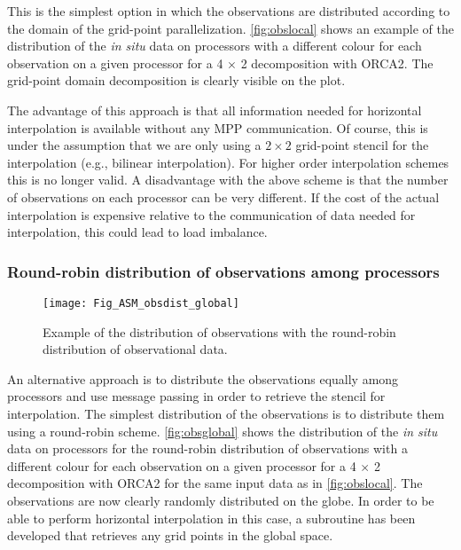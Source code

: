 \documentclass[../main/NEMO_manual]{subfiles}
\begin{document}
This is the simplest option in which the observations are distributed according to
the domain of the grid-point parallelization.
\autoref{fig:obslocal} shows an example of the distribution of the {\em in situ} data on processors with
a different colour for each observation on a given processor for a 4 $\times$ 2 decomposition with ORCA2. 
The grid-point domain decomposition is clearly visible on the plot.

The advantage of this approach is that all information needed for horizontal interpolation is available without
any MPP communication.
Of course, this is under the assumption that we are only using a $2 \times 2$ grid-point stencil for
the interpolation (e.g., bilinear interpolation).
For higher order interpolation schemes this is no longer valid.
A disadvantage with the above scheme is that the number of observations on each processor can be very different.
If the cost of the actual interpolation is expensive relative to the communication of data needed for interpolation,
this could lead to load imbalance.

\subsubsection{Round-robin distribution of observations among processors}

\begin{figure}
  \begin{center}
    \texttt{[image: Fig\_ASM\_obsdist\_global]}
    \caption{
      \protect\label{fig:obsglobal}
      Example of the distribution of observations with the round-robin distribution of observational data.
    }
  \end{center}
\end{figure}

An alternative approach is to distribute the observations equally among processors and
use message passing in order to retrieve the stencil for interpolation.
The simplest distribution of the observations is to distribute them using a round-robin scheme.
\autoref{fig:obsglobal} shows the distribution of the {\em in situ} data on processors for
the round-robin distribution of observations with a different colour for each observation on a given processor for
a 4 $\times$ 2 decomposition with ORCA2 for the same input data as in \autoref{fig:obslocal}.
The observations are now clearly randomly distributed on the globe.
In order to be able to perform horizontal interpolation in this case,
a subroutine has been developed that retrieves any grid points in the global space.
\end{document}

